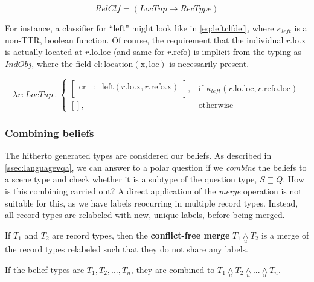 \begin{equation}\label{eq:clf}
RelClf = ( LocTup \rightarrow RecType )
\end{equation}

For instance, a classifier for ``left'' might look like in \autoref{eq:leftclfdef}, where $\kappa_{left}$ is a non-TTR, boolean function.
Of course, the requirement that the individual $r.\text{lo}.\text{x}$ is actually located at $r.\text{lo}.\text{loc}$ (and same for $r.\text{refo}$) is implicit from the typing as $IndObj$, where the field $\text{cl} : \text{location}(\text{x}, \text{loc})$ is necessarily present.

\begin{equation}\label{eq:leftclfdef}
\lambda r : LocTup \ .\ 
\begin{cases}
\left[\begin{array}{rcl}
    \text{cr} &:& \text{left}(r.\text{lo}.\text{x}, r.\text{refo}.\text{x}) \\
\end{array}\right],
& \text{if } \kappa_{left}(r.\text{lo}.\text{loc}, r.\text{refo}.\text{loc}) \\
[], & \text{otherwise}
\end{cases}
\end{equation}



\subsubsection{Combining beliefs}

The hitherto generated types are considered our beliefs.
As described in \autoref{ssec:languagevqa}, we can answer to a polar question if we \textit{combine} the beliefs to a scene type and check whether it is a subtype of the question type, $S \sqsubseteq Q$.
How is this combining carried out?
A direct application of the \textit{merge} operation is not suitable for this, as we have labels reocurring in multiple record types.
Instead, all record types are relabeled with new, unique labels, before being merged.

\label{def:cfmerge}
If $T_1$ and $T_2$ are record types, then the \textbf{conflict-free merge} $T_1 \underset{u}{\wedge} T_2$ is a merge of the record types relabeled such that they do not share any labels.

If the belief types are $T_1, T_2, ..., T_n$, they are combined to $T_1 \underset{u}{\wedge} T_2 \underset{u}{\wedge} ... \underset{u}{\wedge} T_n$.



